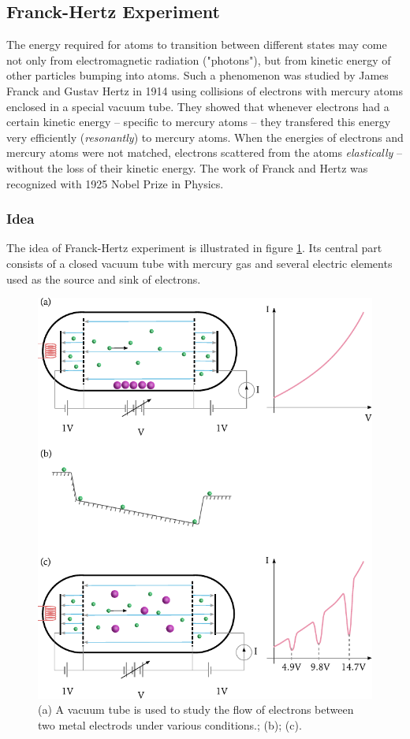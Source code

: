 \subsection{Franck-Hertz Experiment}
The energy required for atoms to transition between different states may come not only from electromagnetic radiation ("photons"), but from kinetic energy of other particles bumping into atoms. Such a phenomenon was studied by James Franck and Gustav Hertz in 1914 using collisions of electrons with mercury atoms enclosed in a special vacuum tube. They showed that whenever electrons had a certain kinetic energy -- specific to mercury atoms -- they transfered this energy very efficiently (\emph{resonantly}) to mercury atoms. When the energies of electrons and mercury atoms were not matched, electrons scattered from the atoms \emph{elastically} -- without the loss of their kinetic energy.  The work of Franck and Hertz was recognized with 1925 Nobel Prize in Physics.

\subsubsection*{Idea}
The idea of Franck-Hertz experiment is illustrated in figure \ref{fig:franckHertzExperiment}. Its central part consists of a closed vacuum tube with mercury gas and several electric elements used as the source and sink of electrons.
\begin{figure}[htbp]
	\centering
	\includegraphics[scale=1.0]{franckHertzExperiment}
	\caption{(a) A vacuum tube is used to study the flow of electrons between two metal electrods under various conditions.; (b); (c).}
	\label{fig:franckHertzExperiment}
\end{figure}


